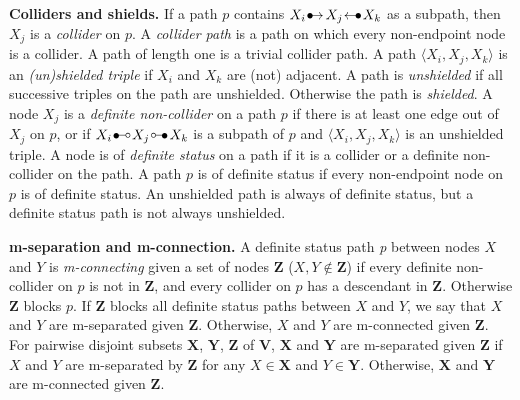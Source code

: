\documentclass[]{article}
\theoremstyle{definition}
\theoremstyle{remark}
\newcommand{\vars}[1][V]{\mathbf{#1}}
\newcommand{\bulletcirc}{
  \setlength{\unitlength}{1mm}
  \begin{picture}(5,1)(0,0)
    \put(0.2,0){$\bullet$}
    \put(1.1, 1){\line(1,0){2.4}}
    \put(4, 1){\circle{1}}
  \end{picture}
}
\newcommand{\circbullet}{
  \setlength{\unitlength}{1mm}
  \begin{picture}(5,1)(0,0)
    \put(1,1){\circle{1}}
    \put(1.5,1){\line(1,0){2.4}}
    \put(2.9,0){$\bullet$}
  \end{picture}
}
\newcommand{\bulletarrow}{
  \setlength{\unitlength}{1mm}
  \begin{picture}(5,1)(0,0)
    \put(0.2,0){$\bullet$}
    \put(1,0){$\rightarrow$}
  \end{picture}
}
\newcommand{\arrowbullet}{
  \setlength{\unitlength}{1mm}
  \begin{picture}(5,1)(0,0)
    \put(0.2,0){$\leftarrow$}
    \put(3,0){$\bullet$}
  \end{picture}
}
\begin{document}
\textbf{Colliders and shields.} If a path $p$ contains $X_i \bulletarrow X_j \arrowbullet X_k$ as a subpath, then $X_j$ is a \textit{collider} on $p$. A \textit{collider path} is a path on which every non-endpoint node is a collider. A  path of length one is a trivial collider path. A path $\langle X_{i},X_{j},X_{k} \rangle$ is an \emph{(un)shielded triple} if $ X_{i} $ and $ X_{k}$ are (not) adjacent. A path is \textit{unshielded} if all successive triples on the path are unshielded. Otherwise the path is \emph{shielded}. A node $X_{j}$ is a \textit{definite non-collider} on a path $p$ if there is at least one edge out of $X_{j}$ on $p$, or if $X_{i} \bulletcirc X_j \circbullet X_k$ is a subpath of $p$ and $\langle X_i,X_j,X_k\rangle$ is an unshielded triple. A node is of \textit{definite status} on a path if it is a collider or a definite non-collider on the path. A path $p$ is of definite status if every non-endpoint node on $p$ is of definite status. An unshielded path is always of definite status, but a
definite status path is not always unshielded.

\textbf{m-separation and m-connection.} A definite status path \textit{p} between nodes $X$ and $Y$ is \textit{m-connecting} given a set of nodes $\mathbf{Z}$ ($X,Y \notin \mathbf{Z}$) if every definite non-collider on $p$ is not in $\mathbf{Z}$, and every collider on $p$ has a descendant in $\mathbf{Z}$. Otherwise $\mathbf{Z}$ blocks $p$.  If $\mathbf{Z}$ blocks all definite status paths between $X$ and $Y$, we say that $X$ and $Y$ are m-separated given $\mathbf{Z}$. Otherwise, $X$ and $Y$ are m-connected given $\mathbf{Z}$. For pairwise disjoint subsets $\mathbf{X}$, $\mathbf{Y}$, $\mathbf{Z}$ of $\vars$, $\mathbf{X}$ and $\mathbf{Y}$ are m-separated given $\mathbf{Z}$ if $X$ and $Y$ are m-separated by $\mathbf{Z}$ for any $X \in \mathbf{X}$ and $Y\in \mathbf{Y}$. Otherwise, $\mathbf{X}$ and $\mathbf{Y}$ are m-connected given $\mathbf{Z}$.
\end{document}
